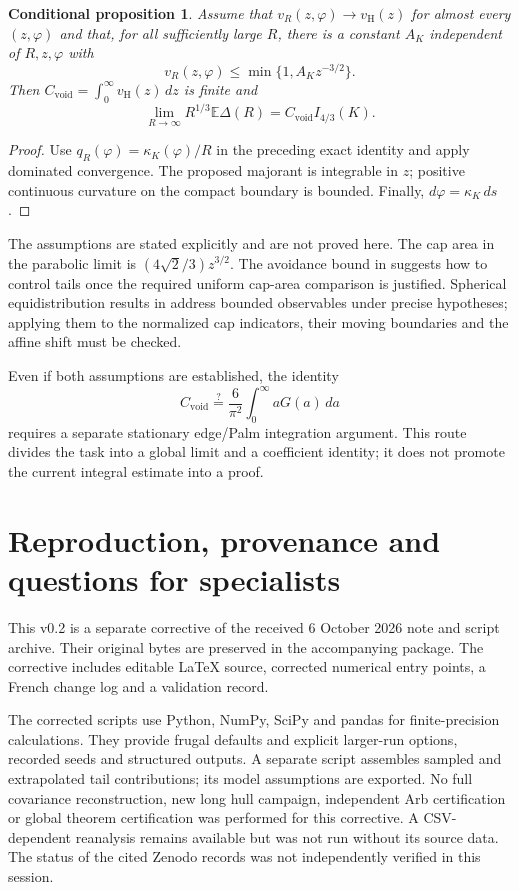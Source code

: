 \documentclass[11pt,a4paper]{article}
\newtheorem{proposition}{Conditional proposition}
\newcommand{\E}{\mathbb E}
\newcommand{\Cvoid}{C_{\mathrm{void}}}
\begin{document}
\begin{proposition}
Assume that $v_R(z,\varphi)\to v_{\mathrm H}(z)$ for almost every $(z,\varphi)$ and that, for all sufficiently large $R$, there is a constant $A_K$ independent of $R,z,\varphi$ with
\[
 v_R(z,\varphi)\leq\min\{1,A_Kz^{-3/2}\}.
\]
Then $\Cvoid=\int_0^\infty v_{\mathrm H}(z)\,dz$ is finite and
\[
 \lim_{R\to\infty}R^{1/3}\E\Delta(R)=\Cvoid I_{4/3}(K).
\]
\end{proposition}
\begin{proof}
Use $q_R(\varphi)=\kappa_K(\varphi)/R$ in the preceding exact identity and apply dominated convergence. The proposed majorant is integrable in $z$; positive continuous curvature on the compact boundary is bounded. Finally, $d\varphi=\kappa_K\,ds$.
\end{proof}
The assumptions are stated explicitly and are not proved here. The cap area in the parabolic limit is $(4\sqrt2/3)z^{3/2}$. The avoidance bound in \cite[Lemma 3.2]{NR} suggests how to control tails once the required uniform cap-area comparison is justified. Spherical equidistribution results in \cite[Section 5]{MS} address bounded observables under precise hypotheses; applying them to the normalized cap indicators, their moving boundaries and the affine shift must be checked.

Even if both assumptions are established, the identity
\[
 \Cvoid\stackrel{?}{=}\frac6{\pi^2}\int_0^\infty aG(a)\,da
\]
requires a separate stationary edge/Palm integration argument. This route divides the task into a global limit and a coefficient identity; it does not promote the current integral estimate into a proof.

\section{Reproduction, provenance and questions for specialists}
This v0.2 is a separate corrective of the received 6 October 2026 note and script archive. Their original bytes are preserved in the accompanying package. The corrective includes editable \LaTeX{} source, corrected numerical entry points, a French change log and a validation record.

The corrected scripts use Python, NumPy, SciPy and pandas for finite-precision calculations. They provide frugal defaults and explicit larger-run options, recorded seeds and structured outputs. A separate script assembles sampled and extrapolated tail contributions; its model assumptions are exported. No full covariance reconstruction, new long hull campaign, independent Arb certification or global theorem certification was performed for this corrective. A CSV-dependent reanalysis remains available but was not run without its source data. The status of the cited Zenodo records was not independently verified in this session.
\end{document}
